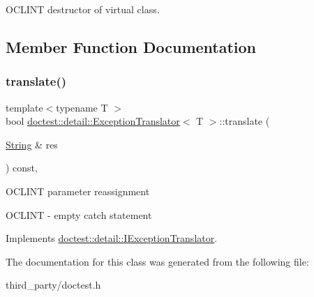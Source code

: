 O\+C\+L\+I\+NT destructor of virtual class. 

\subsection{Member Function Documentation}
\mbox{\label{classdoctest_1_1detail_1_1_exception_translator_a6301f490b029cc2f3113ad5defe373d0}} 
\subsubsection{\texorpdfstring{translate()}{translate()}}
{\footnotesize\ttfamily template$<$typename T $>$ \\
bool \mbox{\hyperlink{classdoctest_1_1detail_1_1_exception_translator}{doctest\+::detail\+::\+Exception\+Translator}}$<$ T $>$\+::translate (\begin{DoxyParamCaption}\item[{\mbox{\hyperlink{classdoctest_1_1_string}{String}} \&}]{res }\end{DoxyParamCaption}) const\hspace{0.3cm}{\ttfamily [inline]}, {\ttfamily [virtual]}}

O\+C\+L\+I\+NT parameter reassignment

O\+C\+L\+I\+NT -\/ empty catch statement 

Implements \mbox{\hyperlink{structdoctest_1_1detail_1_1_i_exception_translator}{doctest\+::detail\+::\+I\+Exception\+Translator}}.



The documentation for this class was generated from the following file\+:\begin{DoxyCompactItemize}
\item 
third\+\_\+party/doctest.\+h\end{DoxyCompactItemize}
